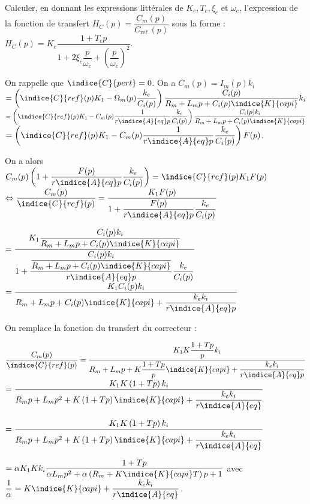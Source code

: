 \begin{question}
\label{2023_ccs_psi_q_16}
Calculer, en donnant les expressions littérales de $K_{c}, T_{c}, \xi_{c}$ et $\omega_{c}$, l'expression de la fonction de transfert $H_{C}(p)=\dfrac{C_{m}(p)}{C_{\text {ref }}(p)}$ sous la forme : $
H_{C}(p)=K_{c} \dfrac{1+T_{c} p}{1+2 \xi_{c} \dfrac{p}{\omega_{c}}+\left(\dfrac{p}{\omega_{c}}\right)^{2}}
$.
\end{question}
\ifprof
\begin{corrige}
On rappelle que $\indice{C}{pert} = 0$.	
On a $C_m(p) = I_m(p) k_i $ 
$=\left(\indice{C}{ref}(p)K_1- \Omega_m(p) \dfrac{k_e}{C_i(p)}\right) \dfrac{C_i(p)}{R_m + L_mp + C_i(p)\indice{K}{capi}}   k_i $ 
$=\left(\indice{C}{ref}(p)K_1- C_m(p) \dfrac{1}{r\indice{A}{eq}p}\dfrac{k_e}{C_i(p)}\right) \dfrac{C_i(p) k_i}{R_m + L_mp + C_i(p)\indice{K}{capi}} $
$=\left(\indice{C}{ref}(p)K_1- C_m(p) \dfrac{1}{r\indice{A}{eq}p}\dfrac{k_e}{C_i(p)}\right) F(p) $. 

On a alors 
$C_m(p) \left(1+\dfrac{F(p)}{r\indice{A}{eq}p}\dfrac{k_e}{C_i(p)}\right)=\indice{C}{ref}(p)K_1 F(p)$
$ \Leftrightarrow \dfrac{C_m(p) }{\indice{C}{ref}(p)} =\dfrac{K_1 F(p)}{1+\dfrac{F(p)}{r\indice{A}{eq}p}\dfrac{k_e}{C_i(p)}} $

$=\dfrac{K_1 \dfrac{C_i(p) k_i}{R_m + L_mp + C_i(p)\indice{K}{capi}}}{1+\dfrac{\dfrac{C_i(p) k_i}{R_m + L_mp + C_i(p)\indice{K}{capi}}}{r\indice{A}{eq}p}\dfrac{k_e}{C_i(p)}} $
$=\dfrac{K_1 C_i(p) k_i}{R_m + L_mp + C_i(p)\indice{K}{capi}+\dfrac{k_e k_i}{r\indice{A}{eq}p}} $

On remplace la fonction du transfert du correcteur :

$\dfrac{C_m(p) }{\indice{C}{ref}(p)}=\dfrac{K_1 K\dfrac{1+Tp}{p} k_i}{R_m + L_mp + K\dfrac{1+Tp}{p}\indice{K}{capi}+\dfrac{k_e k_i}{r\indice{A}{eq}p}} $
$=\dfrac{K_1 K\left(1+Tp\right) k_i}{R_mp + L_mp^2 + K\left(1+Tp\right)\indice{K}{capi}+\dfrac{k_e k_i}{r\indice{A}{eq}}} $

$=\dfrac{K_1 K\left(1+Tp\right) k_i}{R_mp + L_mp^2 + K\left(1+Tp\right)\indice{K}{capi}+\dfrac{k_e k_i}{r\indice{A}{eq}}} $


$=\alpha K_1 Kk_i \dfrac{1+Tp }{\alpha L_mp^2 + \alpha\left(R_m+  K\indice{K}{capi}T\right) p+1} $ avec $\dfrac{1}{\alpha} = K\indice{K}{capi}+\dfrac{k_e k_i}{r\indice{A}{eq}}$.


\end{corrige}

